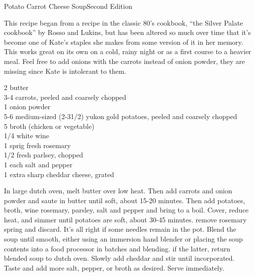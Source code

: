 \begin{entry}{Potato Carrot Cheese Soup}{Second Edition}

\begin{open}
  This recipe began from a recipe in the classic 80's cookbook, ``the Silver
  Palate cookbook'' by Rosso and Lukins, but has been altered so much over
  time that it's become one of Kate's staples she makes from some version of
  it in her memory. This works great on its own on a cold, rainy night or as a
  first course to a heavier meal. Feel free to add onions with the carrots
  instead of onion powder, they are missing since Kate is intolerant to them.
\end{open}
\begin{ingredients}
    \SI{2}{\tblspoon} butter\\
    3-4 carrots, peeled and coarsely chopped\\
    \SI{1}{\teaspoon} onion powder\\
    5-6 medium-sized (2-3\SI{1/2}{\pound}) yukon gold potatoes, peeled and
    coarsely chopped \\
    \SI{5}{\cup} broth (chicken or vegetable)\\
    \SI{1/4}{\cup} white wine \\
    1 sprig fresh rosemary \\
    \SI{1/2}{\cup} fresh parlsey, chopped\\
    \SI{1}{\teaspoon} each salt and pepper\\
    \SI{1}{\cup} extra sharp cheddar cheese, grated
\end{ingredients}
In large dutch oven, melt butter over low heat. Then add carrots and onion
powder and saute in butter until soft, about 15-20 minutes. Then add potatoes,
broth, wine rosemary, parsley, salt and pepper and bring to a boil. Cover,
reduce heat, and simmer until potatoes are soft, about 30-45 minutes. remove
rosemary spring and discard. It's all right if some needles remain in the
pot. Blend the soup until smooth, either using an immersion hand blender or
placing the soup contents into a food processor in batches and blending. if
the latter, return blended soup to dutch oven. Slowly add cheddar and stir
until incorporated. Taste and add more salt, pepper, or broth as
desired. Serve immediately.
\end{entry}